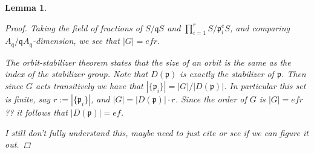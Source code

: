 \documentclass[11pt, a4paper, english]{article}
\newtheorem{lemma}[theorem]{Lemma}
\theoremstyle{definition}
\begin{document}
\begin{lemma}
\begin{proof}
Taking the field of fractions of $S/\mathfrak{q}S$ and $\prod_{i=1}^r S/\mathfrak{p}_i^e S$, and comparing $A_\mathfrak{q}/\mathfrak{q}A_\mathfrak{q}$-dimension, we see that $|G| = efr$.

The orbit-stabilizer theorem states that the size of an orbit is the same as the index of the stabilizer group. Note that $D(\mathfrak{p})$ is exactly the stabilizer of $\mathfrak{p}$. Then since $G$ acts transitively we have that $|\{ \mathfrak{p}_i \}| = |G|/|D(\mathfrak{p})|$. In particular this set is finite, say $r := |\{ \mathfrak{p}_i \}|$, and $|G| = |D(\mathfrak{p})|\cdot r$. Since the order of $G$ is $|G|=efr$ {\color{red} ??} \cite[Proposition~19]{Serre} it follows that $|D(\mathfrak{p})| = ef$.

{\color{red} I still don't fully understand this, maybe need to just cite or see if we can figure it out.}
\end{proof}
\end{lemma}
\end{document}
